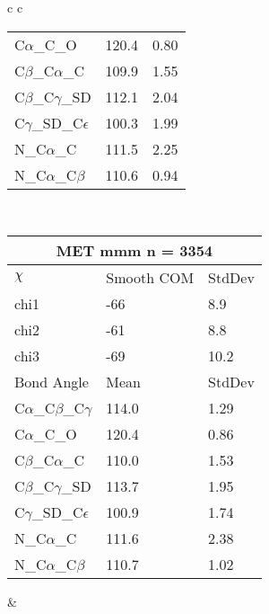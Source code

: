 \begin{longtable}{ c c }
\begin{tabular}{ l l l }
  C$\alpha$\_C\_O & 120.4 & 0.80\\
  C$\beta$\_C$\alpha$\_C & 109.9 & 1.55\\
  C$\beta$\_C$\gamma$\_SD & 112.1 & 2.04\\
  C$\gamma$\_SD\_C$\epsilon$ & 100.3 & 1.99\\
  N\_C$\alpha$\_C & 111.5 & 2.25\\
  N\_C$\alpha$\_C$\beta$ & 110.6 & 0.94\\
  \bottomrule
  \end{tabular}
  \\
  \begin{tabular}{ l l l }
  \toprule
  \multicolumn{3}{c}{MET \textbf{mmm} n = 3354} \\ \toprule
  $\chi$       & Smooth COM & StdDev \\ \midrule
  chi1 & -66 & 8.9 \\ 
  chi2 & -61 & 8.8 \\ 
  chi3 & -69 & 10.2 \\ \midrule
  Bond Angle   & Mean     & StdDev \\ \midrule
  C$\alpha$\_C$\beta$\_C$\gamma$ & 114.0 & 1.29\\
  C$\alpha$\_C\_O & 120.4 & 0.86\\
  C$\beta$\_C$\alpha$\_C & 110.0 & 1.53\\
  C$\beta$\_C$\gamma$\_SD & 113.7 & 1.95\\
  C$\gamma$\_SD\_C$\epsilon$ & 100.9 & 1.74\\
  N\_C$\alpha$\_C & 111.6 & 2.38\\
  N\_C$\alpha$\_C$\beta$ & 110.7 & 1.02\\
  \bottomrule
  \end{tabular}
  &
  \\
  
\end{longtable}

\newpage

